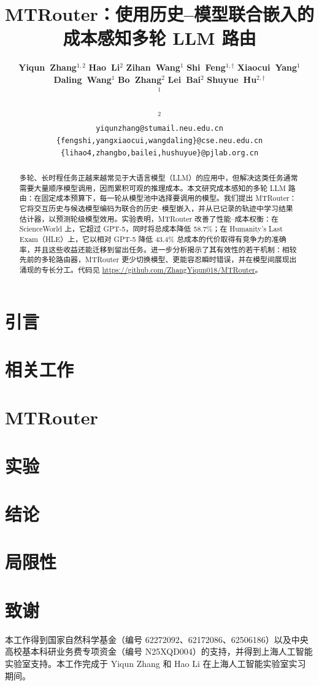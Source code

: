 \documentclass[11pt]{article}
\title{MTRouter：使用历史--模型联合嵌入的成本感知多轮 LLM 路由}
\author{
  \textbf{Yiqun~Zhang}$^{1,2}$ \quad
  \textbf{Hao~Li}$^2$ \quad
  \textbf{Zihan~Wang}$^1$ \quad
  \textbf{Shi~Feng}$^{1,\dag}$ \quad
  \textbf{Xiaocui~Yang}$^1$ \\
  \textbf{Daling~Wang}$^1$ \quad
  \textbf{Bo~Zhang}$^2$ \quad
  \textbf{Lei~Bai}$^{2}$ \quad
  \textbf{Shuyue~Hu}$^{2,\dag}$\\
  $^1$ \text{东北大学计算机科学与工程学院} \\
  \text{中国沈阳 110819} \\
  $^2$ \text{上海人工智能实验室} \\
  \texttt{yiqunzhang@stumail.neu.edu.cn} \\
  \texttt{\{fengshi,yangxiaocui,wangdaling\}@cse.neu.edu.cn} \\
  \texttt{\{lihao4,zhangbo,bailei,hushuyue\}@pjlab.org.cn}
}
\newcommand{\github}{\url{https://github.com/ZhangYiqun018/MTRouter}\xspace}
\begin{document}
\maketitle
\begin{abstract}
多轮、长时程任务正越来越常见于大语言模型（LLM）的应用中，但解决这类任务通常需要大量顺序模型调用，因而累积可观的推理成本。本文研究成本感知的多轮 LLM 路由：在固定成本预算下，每一轮从模型池中选择要调用的模型。我们提出 MTRouter：它将交互历史与候选模型编码为联合的历史--模型嵌入，并从已记录的轨迹中学习结果估计器，以预测轮级模型效用。实验表明，MTRouter 改善了性能--成本权衡：在 ScienceWorld 上，它超过 GPT-5，同时将总成本降低 58.7\%；在 Humanity's Last Exam（HLE）上，它以相对 GPT-5 降低 43.4\% 总成本的代价取得有竞争力的准确率，并且这些收益还能迁移到留出任务。进一步分析揭示了其有效性的若干机制：相较先前的多轮路由器，MTRouter 更少切换模型、更能容忍瞬时错误，并在模型间展现出涌现的专长分工。代码见 \github。
\end{abstract}

\def\thefootnote{\dag}\def\thefootnote{\arabic{footnote}}

\section{引言}


\section{相关工作}


\section{MTRouter}
\label{sec:method}


\section{实验}
\label{sec:experiments}


\section{结论}


\section*{局限性}


\section*{致谢}
本工作得到国家自然科学基金（编号 62272092、62172086、62506186）以及中央高校基本科研业务费专项资金（编号 N25XQD004）的支持，并得到上海人工智能实验室支持。本工作完成于 Yiqun Zhang 和 Hao Li 在上海人工智能实验室实习期间。



\appendix

\end{document}
